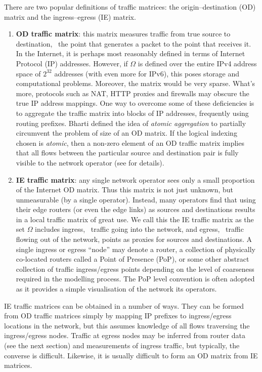 There are two popular definitions of traffic matrices: the
origin--destination (OD) matrix and the ingress--egress (IE) matrix.
\begin{enumerate}

\item \textbf{OD traffic matrix}: this matrix measures traffic from
  true source to destination, \ie~the point that generates a packet
  to the point that receives it. In the Internet, it is perhaps most
  reasonably defined in terms of Internet Protocol (IP) addresses.
  However, if $\Omega$ is defined over the entire IPv4 address space of
  $2^{32}$ addresses (with even more for IPv6), this poses storage and
  computational problems. Moreover, the matrix would be very
  sparse. What's more, protocols such as NAT, HTTP proxies and
  firewalls may obscure the true IP address mappings. One way to
  overcome some of these deficiencies is to aggregate the traffic
  matrix into blocks of IP addresses, frequently using routing
  prefixes. Bharti \etal \cite{Bharti10Invisible} defined the idea of 
  \textit{atomic aggregation}
  to partially circumvent the problem of size of an OD matrix. 
  If the logical indexing chosen is \textit{atomic}, then a 
  non-zero element of an OD traffic matrix implies that all 
  flows between the particular source and destination 
  pair is fully visible to the network operator (see \cite{Bharti10Invisible}
  for details).	

\item \textbf{IE traffic matrix}: any single network operator sees
  only a small proportion of the Internet OD matrix. Thus this matrix
  is not just unknown, but unmeasurable (by a single
  operator). Instead, many operators find that using their edge
  routers (or even the edge links) as sources and destinations results
  in a local traffic matrix of great use. We call this the IE traffic
  matrix as the set $\Omega$ includes ingress, \ie~traffic going into
  the network, and egress, \ie~traffic flowing out of the network,
  points as proxies for sources and destinations. A single ingress or
  egress ``node'' may denote a router, a collection of physically
  co-located routers called a Point of Presence (PoP), or some other
  abstract collection of traffic ingress/egress points depending on
  the level of coarseness required in the modelling process. The PoP
  level convention is often adopted as it provides a simple
  visualisation of the network its operators.
\end{enumerate}

IE traffic matrices can be obtained in a number of ways. They can be
formed from OD traffic matrices simply by mapping IP prefixes to
ingress/egress locations in the network, but this assumes knowledge of
all flows traversing the ingress/egress nodes.  Traffic at egress
nodes may be inferred from router data (see the next section) and
measurements of ingress traffic, but typically, the converse is
difficult. Likewise, it is usually difficult to form an OD matrix from
IE matrices.

